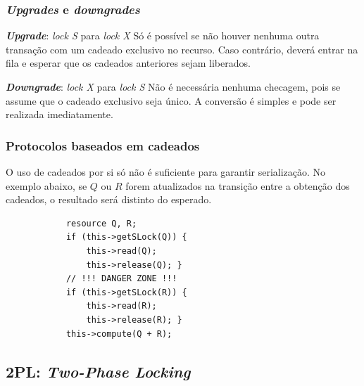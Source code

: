 \documentclass{beamer}
\begin{document}
\begin{frame} %
    \frametitle{\emph{Upgrades} e \emph{downgrades}}

    \begin{block}{\textbf{\emph{Upgrade}}: \emph{lock S} para \emph{lock X}}
        Só é possível se não houver nenhuma outra transação com um cadeado exclusivo no recurso. Caso contrário, deverá entrar na fila e esperar que os cadeados anteriores sejam liberados.
    \end{block}

    \medskip
    \begin{block}{\textbf{\emph{Downgrade}}: \emph{lock X} para \emph{lock S}}
        Não é necessária nenhuma checagem, pois se assume que o cadeado exclusivo seja único. A conversão é simples e pode ser realizada imediatamente.
    \end{block}

\end{frame}


\begin{frame}[fragile] %
    \frametitle{Protocolos baseados em cadeados}

    O uso de cadeados por si só não é suficiente para garantir serialização. No exemplo abaixo, se $Q$ ou $R$ forem atualizados na transição entre a obtenção dos cadeados, o resultado será distinto do esperado.

    \medskip

    \begin{example}
        \begin{verbatim}
            resource Q, R;
            if (this->getSLock(Q)) {
                this->read(Q);
                this->release(Q); }
            // !!! DANGER ZONE !!!
            if (this->getSLock(R)) {
                this->read(R);
                this->release(R); }
            this->compute(Q + R);
        \end{verbatim}
    \end{example}

\end{frame}


\subsection{2PL: \emph{Two-Phase Locking}}
\end{document}
